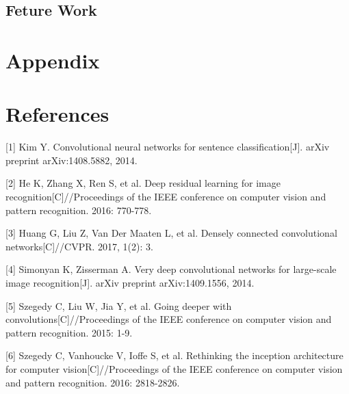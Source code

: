 \documentclass{article}
\begin{document}
\subsection{Feture Work}

\section{Appendix}


\section*{References}

\medskip

\small

[1] Kim Y. Convolutional neural networks for sentence classification[J]. arXiv preprint arXiv:1408.5882, 2014.

[2] He K, Zhang X, Ren S, et al. Deep residual learning for image recognition[C]//Proceedings of the IEEE conference on computer vision and pattern recognition. 2016: 770-778.

[3] Huang G, Liu Z, Van Der Maaten L, et al. Densely connected convolutional networks[C]//CVPR. 2017, 1(2): 3.

[4] Simonyan K, Zisserman A. Very deep convolutional networks for large-scale image recognition[J]. arXiv preprint arXiv:1409.1556, 2014.

[5] Szegedy C, Liu W, Jia Y, et al. Going deeper with convolutions[C]//Proceedings of the IEEE conference on computer vision and pattern recognition. 2015: 1-9.

[6] Szegedy C, Vanhoucke V, Ioffe S, et al. Rethinking the inception architecture for computer vision[C]//Proceedings of the IEEE conference on computer vision and pattern recognition. 2016: 2818-2826.
\end{document}
